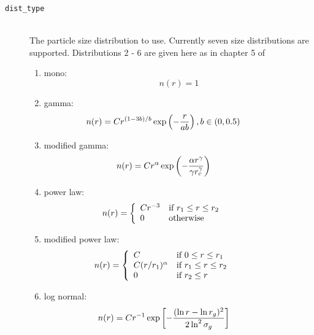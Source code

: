 \begin{description}
\item[\texttt{dist\_type}] \hfill \\
The particle size distribution to use.  Currently seven size distributions are supported.  Distributions 2 - 6 are given here as in chapter 5 of \citet{mishchenko_michael_i_2002b}
\begin{enumerate}
\item mono:
\begin{equation}
n(r) = 1
\label{eq:lmie_inputs_mono_dist}
\end{equation}
\item gamma:
\begin{equation}
\hspace*{-0.5in} n(r) = C r^{(1 - 3b) / b} \exp \left(-\frac{r}{ab}\right), b \in (0, 0.5)
\label{eq:lmie_inputs_gamma_dist}
\end{equation}
\item modified gamma:
\begin{equation}
\hspace*{-0.5in} n(r) = C r^{\alpha} \exp\left(-\frac{\alpha r^{\gamma}}{\gamma r ^{\gamma}_{c}}\right)
\label{eq:lmie_inputs_modified_gamma_dist}
\end{equation}
\item power law:
\begin{equation}
\hspace*{-0.5in} n(r) = \left\{
\begin{array}{ll}
Cr^{-3} & \mbox{if $r_{1} \le r \le r_{2}$} \\
0       & \mbox{otherwise}
\end{array}
\right.
\label{eq:lmie_inputs_power_law_dist}
\end{equation}
\item modified power law:
\begin{equation}
\hspace*{-0.5in} n(r) = \left\{
\begin{array}{ll}
C                   & \mbox{if $0 \le r \le r_{1}$} \\
C(r/r_{1})^{\alpha} & \mbox{if $r_{1} \le r \le r_{2}$} \\
0                   & \mbox{if $r_{2} \le r$}
\end{array}
\right.
\label{eq:lmie_inputs_modified_power_law_dist}
\end{equation}
\item log normal:
\begin{equation}
\hspace*{-0.5in} n(r) = C r^{-1} \exp\left[-\frac{(\ln r - \ln r_{g})^{2}}{2 \ln^{2}\sigma_{g}}\right]

\end{equation}
\end{enumerate}
\end{description}
